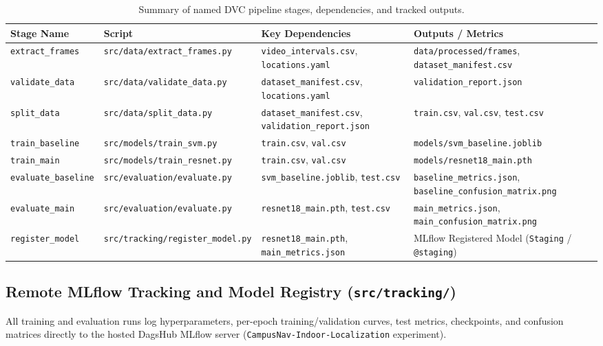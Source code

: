 \documentclass[10pt,a4paper]{article}
\begin{document}
\begin{table}[h!]
\centering
\small
\begin{tabular}{llp{4.6cm}p{4.4cm}}
\toprule
\textbf{Stage Name} & \textbf{Script} & \textbf{Key Dependencies} & \textbf{Outputs / Metrics} \\
\midrule
\texttt{extract\_frames} & \texttt{src/data/extract\_frames.py} & \texttt{video\_intervals.csv}, \texttt{locations.yaml} & \texttt{data/processed/frames}, \texttt{dataset\_manifest.csv} \\
\texttt{validate\_data} & \texttt{src/data/validate\_data.py} & \texttt{dataset\_manifest.csv}, \texttt{locations.yaml} & \texttt{validation\_report.json} \\
\texttt{split\_data} & \texttt{src/data/split\_data.py} & \texttt{dataset\_manifest.csv}, \texttt{validation\_report.json} & \texttt{train.csv}, \texttt{val.csv}, \texttt{test.csv} \\
\texttt{train\_baseline} & \texttt{src/models/train\_svm.py} & \texttt{train.csv}, \texttt{val.csv} & \texttt{models/svm\_baseline.joblib} \\
\texttt{train\_main} & \texttt{src/models/train\_resnet.py} & \texttt{train.csv}, \texttt{val.csv} & \texttt{models/resnet18\_main.pth} \\
\texttt{evaluate\_baseline} & \texttt{src/evaluation/evaluate.py} & \texttt{svm\_baseline.joblib}, \texttt{test.csv} & \texttt{baseline\_metrics.json}, \texttt{baseline\_confusion\_matrix.png} \\
\texttt{evaluate\_main} & \texttt{src/evaluation/evaluate.py} & \texttt{resnet18\_main.pth}, \texttt{test.csv} & \texttt{main\_metrics.json}, \texttt{main\_confusion\_matrix.png} \\
\texttt{register\_model} & \texttt{src/tracking/register\_model.py} & \texttt{resnet18\_main.pth}, \texttt{main\_metrics.json} & MLflow Registered Model (\texttt{Staging} / \texttt{@staging}) \\
\bottomrule
\end{tabular}
\caption{Summary of named DVC pipeline stages, dependencies, and tracked outputs.}
\end{table}

\subsection{Remote MLflow Tracking and Model Registry (\texttt{src/tracking/})}
All training and evaluation runs log hyperparameters, per-epoch training/validation curves, test metrics, checkpoints, and confusion matrices directly to the hosted DagsHub MLflow server (\texttt{CampusNav-Indoor-Localization} experiment).
\end{document}
